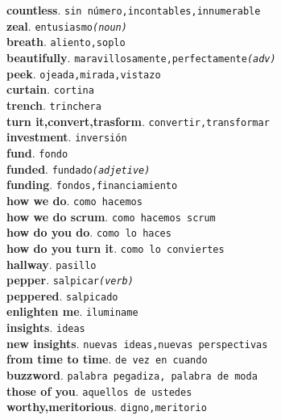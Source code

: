 \documentclass[twocolumn]{article}
\begin{document}
	\textsf{\textbf{countless}}. \texttt{sin número,incontables,innumerable}\\
	\textsf{\textbf{zeal}}. \texttt{entusiasmo{\scriptsize \textsl{(noun)}}}\\
	\textsf{\textbf{breath}}. \texttt{aliento,soplo}\\
	\textsf{\textbf{beautifully}}. \texttt{maravillosamente,perfectamente{\scriptsize \textsl{(adv)}}}\\
	\textsf{\textbf{peek}}. \texttt{ojeada,mirada,vistazo}\\
	\textsf{\textbf{curtain}}. \texttt{cortina}\\
	\textsf{\textbf{trench}}. \texttt{trinchera}\\
	\textsf{\textbf{turn it,convert,trasform}}. \texttt{convertir,transformar}\\
	\textsf{\textbf{investment}}. \texttt{inversi\'on}\\
	\textsf{\textbf{fund}}. \texttt{fondo}\\
	\textsf{\textbf{funded}}. \texttt{fundado{\scriptsize \textsl{(adjetive)}}}\\
	\textsf{\textbf{funding}}. \texttt{fondos,financiamiento}\\
	\textsf{\textbf{how we do}}. \texttt{como hacemos}\\
	\textsf{\textbf{how we do scrum}}. \texttt{como hacemos scrum}\\
	\textsf{\textbf{how do you do}}. \texttt{como lo haces}\\
	\textsf{\textbf{how do you turn it}}. \texttt{como lo conviertes}\\
	\textsf{\textbf{hallway}}. \texttt{pasillo}\\
	\textsf{\textbf{pepper}}. \texttt{salpicar{\scriptsize \textsl{(verb)}}}\\
	\textsf{\textbf{peppered}}. \texttt{salpicado}\\
	\textsf{\textbf{enlighten me}}. \texttt{iluminame}\\
	\textsf{\textbf{insights}}. \texttt{ideas}\\
	\textsf{\textbf{new insights}}. \texttt{nuevas ideas,nuevas perspectivas}\\
	\textsf{\textbf{from time to time}}. \texttt{de vez en cuando}\\
	\textsf{\textbf{buzzword}}. \texttt{palabra pegadiza, palabra de moda}\\
	\textsf{\textbf{those of you}}. \texttt{aquellos de ustedes}\\
	\textsf{\textbf{worthy,meritorious}}. \texttt{digno,meritorio}\\
\end{document}
